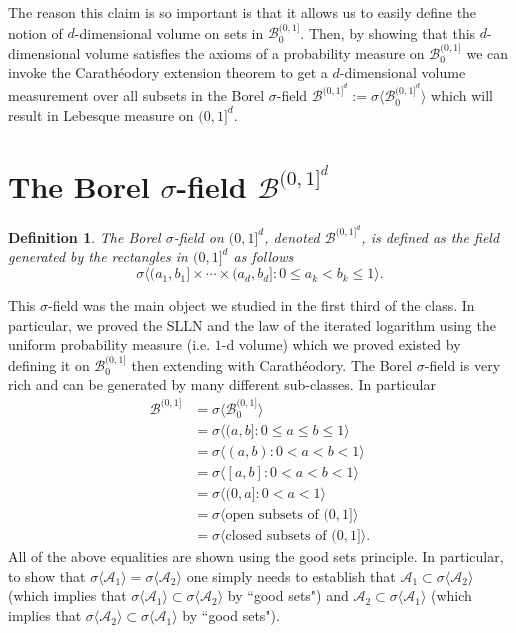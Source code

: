 \documentclass[10pt,letterpaper,twocolumn]{article}
\newtheorem{definition}{Definition}
\begin{document}
The reason this claim is so important is that it allows us to easily define the notion of $d$-dimensional volume  on sets in $\mathcal B_0^{(0,1]}$.  Then, by showing that this $d$-dimensional volume satisfies the axioms of a probability measure on $\mathcal B_0^{(0,1]}$  we can invoke the Carath\'eodory extension theorem to get a $d$-dimensional volume measurement over all subsets in the Borel $\sigma$-field $\mathcal B^{(0,1]^d} :=\sigma \langle \mathcal B_0^{(0,1]^d}\rangle$ which will result in Lebesque measure on $(0,1]^d$.


\section{The Borel $\sigma$-field $\mathcal B^{(0,1]^d}$}

\begin{definition} The Borel $\sigma$-field on $(0,1]^d$, denoted $\mathcal B^{(0,1]^d}$, is defined as the field generated by the rectangles in $(0,1]^d$ as follows
\[
 \sigma\bigl \langle (a_1,b_1]\times\cdots\times (a_d,b_d] : 0\leq a_k < b_k\leq 1 \bigr\rangle.
\]
\end{definition}

This $\sigma$-field was the main object  we studied in the first third of the class. In particular, we proved  the SLLN and the law of the iterated logarithm using the uniform probability measure (i.e.\! $1$-d volume) which we proved existed by defining it on $\mathcal B_0^{(0,1]}$ then extending with Carath\'eodory.  
The Borel $\sigma$-field is very rich and can be generated by many different sub-classes. In particular 
\begin{align*}
\mathcal B^{(0,1]} 
&=\sigma\langle \mathcal B_0^{(0,1]}\rangle \\
&= \sigma\bigl\langle (a,b]: 0\leq a \leq b \leq 1 \bigr\rangle \\
  & =\sigma\bigl\langle (a,b): 0< a < b <1  \bigr\rangle \\
  & =\sigma\bigl\langle [a,b]: 0< a < b <1  \bigr\rangle \\
    & =\sigma\bigl\langle (0,a]: 0< a  <1  \bigr\rangle \\
& = \sigma\bigl\langle \text{open subsets of $(0,1]$}  \bigr\rangle  \\
& = \sigma\bigl\langle \text{closed subsets of $(0,1]$}  \bigr\rangle.
\end{align*}
All of the above equalities are shown using the good sets principle. In particular, to show that $\sigma\langle \mathcal A_1\rangle=\sigma\langle\mathcal A_2 \rangle$ one simply needs to establish that $ \mathcal A_1 \subset \sigma\langle \mathcal A_2\rangle$ (which implies that $ \sigma\langle \mathcal A_1\rangle \subset \sigma\langle \mathcal A_2\rangle$ by ``good sets") and $ \mathcal A_2 \subset \sigma\langle \mathcal A_1\rangle$ (which implies that $ \sigma\langle \mathcal A_2\rangle \subset \sigma\langle \mathcal A_1\rangle$ by ``good sets").
\end{document}
